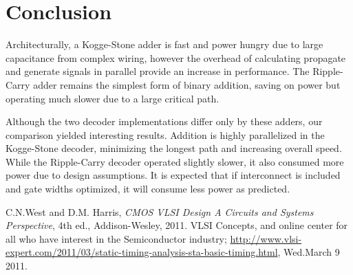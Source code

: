 \documentclass[conference]{IEEEtran}
\begin{document}
\section{Conclusion}

Architecturally, a Kogge-Stone adder is fast and power hungry due to large capacitance from complex wiring, however the overhead of calculating propagate and generate signals in parallel provide an increase in performance. The Ripple-Carry adder remains the simplest form of binary addition, saving on power but operating much slower due to a large critical path.

Although the two decoder implementations differ only by these adders, our comparison yielded interesting results. Addition is highly parallelized in the Kogge-Stone decoder, minimizing the longest path and increasing overall speed. While the Ripple-Carry decoder operated slightly slower, it also consumed more power due to design assumptions. It is expected that if interconnect is included and gate widths optimized, it will consume less power as predicted.




\ifCLASSOPTIONcaptionsoff
  \newpage
\fi





%
%
%
\begin{thebibliography}{1}

C.N.West and D.M. Harris, \emph{CMOS VLSI Design A Circuits and Systems Perspective}, 4th ed., Addison-Wesley, 2011.
VLSI Concepts, and online center for all who have interest in the Semiconductor industry; \url{http://www.vlsi-expert.com/2011/03/static-timing-analysis-sta-basic-timing.html}, Wed.March 9 2011.


\end{thebibliography}
\end{document}
